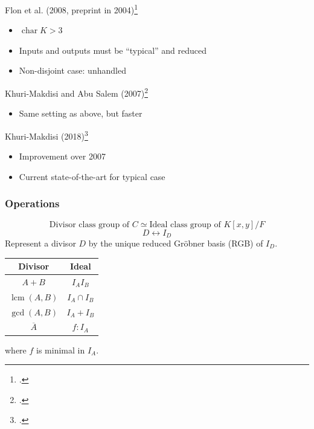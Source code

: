 \documentclass{beamer}
\newcommand{\pid}[1]{\left\langle #1 \right\rangle}
\newcommand{\defn}{\textbf}
\DeclareMathOperator{\Char}{char}
\DeclareMathOperator{\lcm}{lcm}
\renewcommand{\bar}{\overline}
\begin{document}

\begin{frame}
  Flon et al. (2008, preprint in 2004)\footcite{flon08}
  \begin{itemize}
    \item $\Char K > 3$
    \item Inputs and outputs must be ``typical'' and reduced
    \item Non-disjoint case: unhandled
  \end{itemize}
  \vspace{10pt}
  Khuri-Makdisi and Abu Salem (2007)\footcite{kamal07}
  \begin{itemize}
    \item Same setting as above, but faster
  \end{itemize}
  \vspace{10pt}
  Khuri-Makdisi (2018)\footcite{kamal18}
  \begin{itemize}
    \item Improvement over 2007
    \item Current state-of-the-art for typical case
  \end{itemize}
\end{frame}


\begin{frame}
\frametitle{Operations}
  \[ \text{Divisor class group of $C$} \simeq \text{Ideal class group of $K[x,y]/F$}\]
  \[ D \longleftrightarrow I_D \]
  Represent a divisor $D$ by the unique reduced Gr\"obner basis (RGB) of $I_D$. \\
  \begin{center}
    \begin{tabular}{c|c}
      Divisor & Ideal \\
      \hline
      $A + B$ & $I_A I_B$ \\
      $\lcm(A,B)$ & $I_A \cap I_B$ \\
      $\gcd(A,B)$ & $I_A + I_B$ \\
      $\bar A$ & $f : I_A$
    \end{tabular}
  \end{center}
  where $f$ is minimal in $I_A$.
\end{frame}
\end{document}
